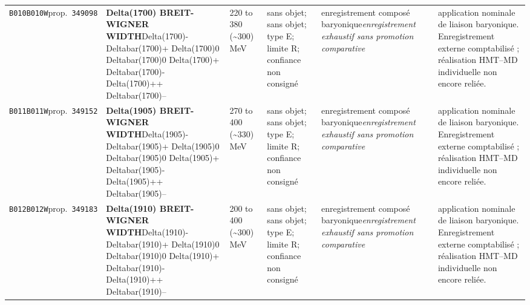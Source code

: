 \begin{landscape}
\begin{longtable}{L{1.85cm}L{4.45cm}L{2.35cm}L{4.05cm}L{3.35cm}L{7.15cm}}
\texttt{B010}\newline \texttt{B010W}\newline prop.\ \texttt{349098} & \textbf{Delta(1700) BREIT-WIGNER WIDTH}\newline Delta(1700)- \textbar{}\allowbreak{} Deltabar(1700)+ \textbar{}\allowbreak{} Delta(1700)0 \textbar{}\allowbreak{} Deltabar(1700)0 \textbar{}\allowbreak{} Delta(1700)+ \textbar{}\allowbreak{} Deltabar(1700)- \textbar{}\allowbreak{} Delta(1700)++ \textbar{}\allowbreak{} Deltabar(1700)-- & 220 to 380 (\textasciitilde{}300)\,MeV & sans objet; sans objet; type E; limite R; confiance non consigné & enregistrement composé baryonique\newline \emph{enregistrement exhaustif sans promotion comparative} & application nominale de liaison baryonique. Enregistrement externe comptabilisé ; réalisation HMT--MD individuelle non encore reliée. \\
\texttt{B011}\newline \texttt{B011W}\newline prop.\ \texttt{349152} & \textbf{Delta(1905) BREIT-WIGNER WIDTH}\newline Delta(1905)- \textbar{}\allowbreak{} Deltabar(1905)+ \textbar{}\allowbreak{} Delta(1905)0 \textbar{}\allowbreak{} Deltabar(1905)0 \textbar{}\allowbreak{} Delta(1905)+ \textbar{}\allowbreak{} Deltabar(1905)- \textbar{}\allowbreak{} Delta(1905)++ \textbar{}\allowbreak{} Deltabar(1905)-- & 270 to 400 (\textasciitilde{}330)\,MeV & sans objet; sans objet; type E; limite R; confiance non consigné & enregistrement composé baryonique\newline \emph{enregistrement exhaustif sans promotion comparative} & application nominale de liaison baryonique. Enregistrement externe comptabilisé ; réalisation HMT--MD individuelle non encore reliée. \\
\texttt{B012}\newline \texttt{B012W}\newline prop.\ \texttt{349183} & \textbf{Delta(1910) BREIT-WIGNER WIDTH}\newline Delta(1910)- \textbar{}\allowbreak{} Deltabar(1910)+ \textbar{}\allowbreak{} Delta(1910)0 \textbar{}\allowbreak{} Deltabar(1910)0 \textbar{}\allowbreak{} Delta(1910)+ \textbar{}\allowbreak{} Deltabar(1910)- \textbar{}\allowbreak{} Delta(1910)++ \textbar{}\allowbreak{} Deltabar(1910)-- & 200 to 400 (\textasciitilde{}300)\,MeV & sans objet; sans objet; type E; limite R; confiance non consigné & enregistrement composé baryonique\newline \emph{enregistrement exhaustif sans promotion comparative} & application nominale de liaison baryonique. Enregistrement externe comptabilisé ; réalisation HMT--MD individuelle non encore reliée. \\

\end{longtable}
\end{landscape}
